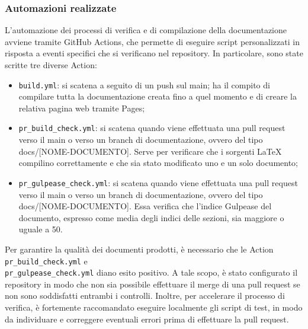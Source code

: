 \subsubsection{Automazioni realizzate}
L'automazione dei processi di verifica e di compilazione della documentazione
avviene tramite GitHub Actions, che permette di eseguire script personalizzati
in risposta a eventi specifici che si verificano nel repository. In
particolare, sono state scritte tre diverse Action:
\begin{itemize}
    \item \texttt{build.yml}: si scatena a seguito di un push sul main; ha il compito di compilare
          tutta la documentazione creata fino a quel momento e di creare la relativa pagina web tramite Pages;
    \item \texttt{pr\_build\_check.yml}: si scatena quando viene effettuata una pull request verso il main o verso
          un branch di documentazione, ovvero del tipo docs/[NOME-DOCUMENTO]. Serve per verificare che
          i sorgenti LaTeX compilino correttamente e che sia stato modificato uno e un solo documento;
    \item \texttt{pr\_gulpease\_check.yml}: si scatena quando viene effettuata una pull request verso il main o verso
          un branch di documentazione, ovvero del tipo docs/[NOME-DOCUMENTO]. Essa verifica che
          l'indice Gulpease del documento, espresso come media degli indici delle sezioni, sia maggiore o uguale a 50.
\end{itemize}
Per garantire la qualità dei documenti prodotti, è necessario che le Action \texttt{pr\_build\_check.yml}
e \\\texttt{pr\_gulpease\_check.yml} diano esito positivo. A tale scopo, è stato configurato il repository in modo
che non sia possibile effettuare il merge di una pull request se non sono soddisfatti entrambi i controlli.
Inoltre, per accelerare il processo di verifica, è fortemente raccomandato eseguire localmente gli script di test,
in modo da individuare e correggere eventuali errori prima di effettuare la pull request.
